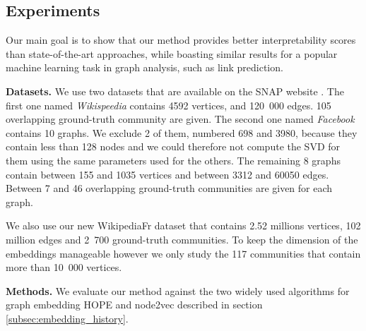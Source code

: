 \subsection{Experiments}\label{sec:exp}

Our main goal is to show that our method provides better interpretability scores than state-of-the-art approaches, while boasting similar results for a popular machine learning task in graph analysis, such as link prediction. 

\noindent\textbf{Datasets.}
We use two datasets that are available on the SNAP website \cite{SNAP_paper}. The first one named \textit{Wikispeedia} contains 4592 vertices, and 120~000 edges. 105 overlapping ground-truth community are given. The second one named \textit{Facebook} contains 10 graphs. We exclude 2 of them, numbered 698 and 3980, because they contain less than 128 nodes and we could therefore not compute the SVD for them using the same parameters used for the others. The remaining 8 graphs contain between 155 and 1035 vertices and between 3312 and 60050 edges. Between 7 and 46 overlapping ground-truth communities are given for each graph.

We also use our new WikipediaFr dataset that contains 2.52 millions vertices, 102 million edges and 2~700 ground-truth communities. To keep the dimension of the embeddings manageable however we only study the 117 communities that contain more than 10~000 vertices.


\noindent\textbf{Methods.} 
We evaluate our method against the two widely used algorithms for graph embedding HOPE and node2vec described in section \ref{subsec:embedding_history}.

